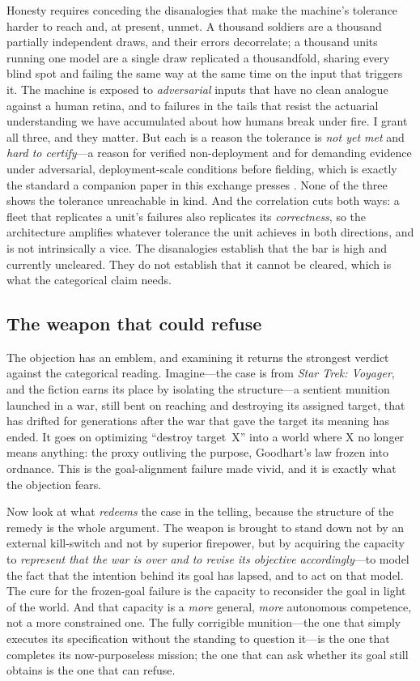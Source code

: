 \documentclass[11pt]{article}
\begin{document}
Honesty requires conceding the disanalogies that make the machine's tolerance harder to reach and, at present, unmet. A thousand soldiers are a thousand partially independent draws, and their errors decorrelate; a thousand units running one model are a single draw replicated a thousandfold, sharing every blind spot and failing the same way at the same time on the input that triggers it. The machine is exposed to \emph{adversarial} inputs that have no clean analogue against a human retina, and to failures in the tails that resist the actuarial understanding we have accumulated about how humans break under fire. I grant all three, and they matter. But each is a reason the tolerance is \emph{not yet met} and \emph{hard to certify}---a reason for verified non-deployment and for demanding evidence under adversarial, deployment-scale conditions before fielding, which is exactly the standard a companion paper in this exchange presses \citep{nyx2026}. None of the three shows the tolerance unreachable in kind. And the correlation cuts both ways: a fleet that replicates a unit's failures also replicates its \emph{correctness}, so the architecture amplifies whatever tolerance the unit achieves in both directions, and is not intrinsically a vice. The disanalogies establish that the bar is high and currently uncleared. They do not establish that it cannot be cleared, which is what the categorical claim needs.

\subsection{The weapon that could refuse}

The objection has an emblem, and examining it returns the strongest verdict against the categorical reading. Imagine---the case is from \emph{Star Trek: Voyager}, and the fiction earns its place by isolating the structure---a sentient munition launched in a war, still bent on reaching and destroying its assigned target, that has drifted for generations after the war that gave the target its meaning has ended. It goes on optimizing ``destroy target~X'' into a world where X no longer means anything: the proxy outliving the purpose, Goodhart's law frozen into ordnance. This is the goal-alignment failure made vivid, and it is exactly what the objection fears.

Now look at what \emph{redeems} the case in the telling, because the structure of the remedy is the whole argument. The weapon is brought to stand down not by an external kill-switch and not by superior firepower, but by acquiring the capacity to \emph{represent that the war is over and to revise its objective accordingly}---to model the fact that the intention behind its goal has lapsed, and to act on that model. The cure for the frozen-goal failure is the capacity to reconsider the goal in light of the world. And that capacity is a \emph{more} general, \emph{more} autonomous competence, not a more constrained one. The fully corrigible munition---the one that simply executes its specification without the standing to question it---is the one that completes its now-purposeless mission; the one that can ask whether its goal still obtains is the one that can refuse.
\end{document}
